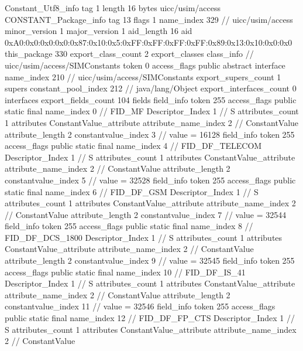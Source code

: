 {{{		}
		Constant_Utf8_info {
			tag	1
			length	16
			bytes	uicc/usim/access
		}
		CONSTANT_Package_info {
			tag	13
			flags	1
			name_index	329		// uicc/usim/access
			minor_version	1
			major_version	1
			aid_length	16
			aid	0xA0:0x0:0x0:0x0:0x87:0x10:0x5:0xFF:0xFF:0xFF:0xFF:0x89:0x13:0x10:0x0:0x0
		}
	}
	this_package	330
	export_class_count	2
	export_classes {
		class_info {		// uicc/usim/access/SIMConstants
			token	0
			access_flags	public abstract interface
			name_index	210		// uicc/usim/access/SIMConstants
			export_supers_count	1
			supers {
				constant_pool_index	212		// java/lang/Object
			}
			export_interfaces_count	0
			interfaces {
			}
			export_fields_count	104
			fields {
			field_info {
				token	255
				access_flags	public static final
				name_index	0		// FID_MF
				Descriptor_Index	1		// S
				attributes_count	1
				attributes {
				ConstantValue_attribute {
					attribute_name_index	2		// ConstantValue
					attribute_length	2
					constantvalue_index	3		// value = 16128
				}
				}
			}
			field_info {
				token	255
				access_flags	public static final
				name_index	4		// FID_DF_TELECOM
				Descriptor_Index	1		// S
				attributes_count	1
				attributes {
				ConstantValue_attribute {
					attribute_name_index	2		// ConstantValue
					attribute_length	2
					constantvalue_index	5		// value = 32528
				}
				}
			}
			field_info {
				token	255
				access_flags	public static final
				name_index	6		// FID_DF_GSM
				Descriptor_Index	1		// S
				attributes_count	1
				attributes {
				ConstantValue_attribute {
					attribute_name_index	2		// ConstantValue
					attribute_length	2
					constantvalue_index	7		// value = 32544
				}
				}
			}
			field_info {
				token	255
				access_flags	public static final
				name_index	8		// FID_DF_DCS_1800
				Descriptor_Index	1		// S
				attributes_count	1
				attributes {
				ConstantValue_attribute {
					attribute_name_index	2		// ConstantValue
					attribute_length	2
					constantvalue_index	9		// value = 32545
				}
				}
			}
			field_info {
				token	255
				access_flags	public static final
				name_index	10		// FID_DF_IS_41
				Descriptor_Index	1		// S
				attributes_count	1
				attributes {
				ConstantValue_attribute {
					attribute_name_index	2		// ConstantValue
					attribute_length	2
					constantvalue_index	11		// value = 32546
				}
				}
			}
			field_info {
				token	255
				access_flags	public static final
				name_index	12		// FID_DF_FP_CTS
				Descriptor_Index	1		// S
				attributes_count	1
				attributes {
				ConstantValue_attribute {
					attribute_name_index	2		// ConstantValue
}}}}}}}
